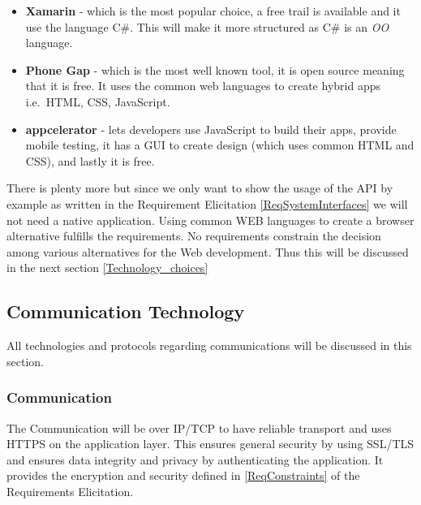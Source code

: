 \documentclass[a4paper,11pt]{article}
\begin{document}
\begin{itemize}
\item
  \textbf{Xamarin} - which is the most popular choice, a free trail is
  available and it use the language C\#. This will make it more
  structured as C\# is an \emph{OO} language.
\item
  \textbf{Phone Gap} - which is the most well known tool, it is open
  source meaning that it is free. It uses the common web languages to
  create hybrid apps i.e.~HTML, CSS, JavaScript.
\item
  \textbf{appcelerator} - lets developers use JavaScript to build their
  apps, provide mobile testing, it has a GUI to create design (which
  uses common HTML and CSS), and lastly it is free.
\end{itemize}

\noindent There is plenty more but since we only want to show the usage of the API by example as written in the Requirement Elicitation \ref{ReqSystemInterfaces} we will not need a native application. Using common WEB languages to create a browser alternative fulfills the requirements. No requirements constrain the decision among various alternatives for the Web development. Thus this will be discussed in the next section \ref{Technology_choices}

\subsection{Communication Technology}
All technologies and protocols regarding communications will be discussed in this section. 

\subsubsection{Communication}
The Communication will be over IP/TCP to have reliable transport and uses HTTPS on the application layer. This ensures general security by using SSL/TLS and ensures data integrity and privacy by authenticating the application. It provides the encryption and security defined in \ref{ReqConstraints} of the Requirements Elicitation.
\end{document}
